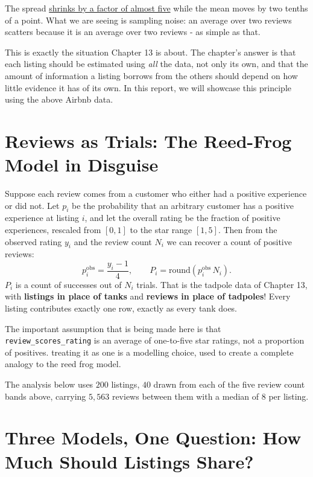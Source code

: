\documentclass[11pt,a4paper]{article}
\begin{document}
The spread \underline{shrinks by a factor of almost five} while the mean moves by two
tenths of a point. What we are seeing is sampling noise: an average over two reviews scatters because it
is an average over two reviews - as simple as that.

This is exactly the situation Chapter 13 is about. The chapter's answer is that each listing
should be estimated using \textit{all} the data, not only its own, and that the amount of information a
listing borrows from the others should depend on how little evidence it has of its own. In this
report, we will showcase this principle using the above Airbnb data.

\section{Reviews as Trials: The Reed-Frog Model in Disguise}

Suppose each review comes from a customer who either had a positive experience
or did not. Let $p_i$ be the probability that an arbitrary customer has a
positive experience at listing $i$, and let the overall rating be the fraction
of positive experiences, rescaled from $[0,1]$ to the star range $[1,5]$. Then
from the observed rating $y_i$ and the review count $N_i$ we can recover a
count of positive reviews:
\[
  p^{\text{obs}}_i = \frac{y_i - 1}{4},
  \qquad
  P_i = \text{round}\!\left(p^{\text{obs}}_i \, N_i\right).
\]
$P_i$ is a count of successes out of $N_i$ trials. That is the tadpole data of
Chapter 13, with \textbf{listings in place of tanks} and \textbf{reviews in
place of tadpoles}! Every listing contributes exactly one row, exactly as every
tank does.
\begin{notebox}
The important assumption that is being made here is that \texttt{review\_scores\_rating} is an average of
one-to-five star ratings, not a proportion of positives. treating it as one is
a modelling choice, used to create a complete analogy to the reed frog model.
\end{notebox}

The analysis below uses $200$ listings, $40$ drawn from each of the five review
count bands above, carrying $5{,}563$ reviews between them with a median of $8$
per listing. 

\section{Three Models, One Question: How Much Should Listings Share?}
\end{document}
